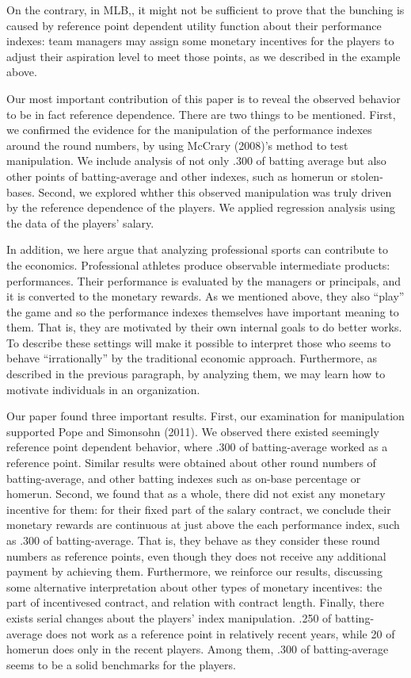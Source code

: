 \documentclass[dvipdfmx, 12pt]{article}
\begin{document}
On the contrary, in MLB,, it might not be sufficient to prove that the bunching is caused by reference point dependent utility function about their performance indexes: team managers may assign some monetary incentives for the players to adjust their aspiration level to meet those points, as we described in the example above.

Our most important contribution of this paper is to reveal the observed behavior to be in fact reference dependence. There are two things to be mentioned. First, we confirmed the evidence for the manipulation of the performance indexes around the round numbers, by using McCrary (2008)'s method to test manipulation. We include analysis of not only .300 of batting average but also other points of batting-average and other indexes, such as homerun or stolen-bases. Second, we explored whther this observed manipulation was truly driven by the reference dependence of the players. We applied regression analysis using the data of the players' salary.

In addition, we here argue that analyzing professional sports can contribute to the economics. Professional athletes produce observable intermediate products: performances. Their performance is evaluated by the managers or principals, and it is converted to the monetary rewards. As we mentioned above, they also ``play'' the game and so the performance indexes themselves have important meaning to them. That is, they are motivated by their own internal goals to do better works. To describe these settings will make it possible to interpret those who seems to behave ``irrationally'' by the traditional economic approach. Furthermore, as described in the previous paragraph, by analyzing them, we may learn how to motivate individuals in an organization.

Our paper found three important results. First, our examination for manipulation supported Pope and Simonsohn (2011). We observed there  existed seemingly reference point dependent behavior, where .300 of batting-average worked as a reference point. Similar results were obtained about other round numbers of batting-average, and other batting indexes such as on-base percentage or homerun. Second, we found that as a whole, there did not exist any monetary incentive for them: for their fixed part of the salary contract, we conclude their monetary rewards are continuous at just above the each performance index, such as .300 of batting-average. That is, they behave as they consider these round numbers as reference points, even though they does not receive any additional payment by achieving them. Furthermore, we reinforce our results, discussing some alternative interpretation about other types of monetary incentives: the part of incentivesed contract, and relation with contract length. Finally, there exists serial changes about the players' index manipulation. .250 of batting-average does not work as a reference point in relatively recent years, while 20 of homerun does only in the recent players. Among them, .300 of batting-average seems to be a solid benchmarks for the players.
\end{document}
